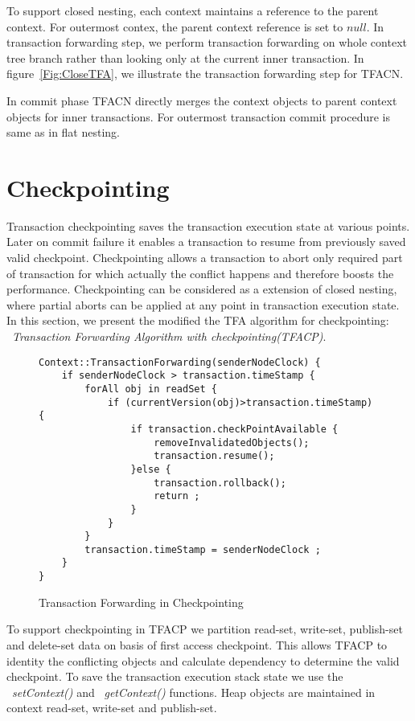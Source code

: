 \documentclass[12pt,english]{report}
\begin{document}
To support closed nesting, each context maintains a reference to the parent context. For outermost contex, the parent context reference is set to $null$. In transaction forwarding step, we perform transaction forwarding on whole context tree branch rather than looking only at the current inner transaction. In figure~\ref{Fig:CloseTFA}, we illustrate the transaction forwarding step for TFACN.

In commit phase TFACN directly merges the context objects to parent context objects for inner transactions. For outermost transaction commit procedure is same as in flat nesting. 

\section{Checkpointing}

Transaction checkpointing saves the transaction execution state at various points. Later on commit failure it enables a transaction to resume from previously saved valid checkpoint. Checkpointing allows a transaction to abort only required part of transaction for which actually the conflict happens and therefore boosts the performance. Checkpointing can be considered as a extension of closed nesting, where partial aborts can be applied at any point in transaction execution state. In this section, we present the modified the TFA algorithm for checkpointing: ~\emph{Transaction Forwarding Algorithm with checkpointing(TFACP)}.

\begin{figure}[H]
\begin{minipage}[b]{0.9\linewidth}\centering
\begin{lstlisting}
Context::TransactionForwarding(senderNodeClock) {
	if senderNodeClock > transaction.timeStamp {
		forAll obj in readSet {
			if (currentVersion(obj)>transaction.timeStamp) { 
				if transaction.checkPointAvailable {
					removeInvalidatedObjects();
					transaction.resume();
				}else {
					transaction.rollback();
					return ;
				}		
			}
		}
		transaction.timeStamp = senderNodeClock ; 
	}
}
\end{lstlisting}
\end{minipage}
\caption{Transaction Forwarding in Checkpointing}
\label{Fig:CheckPointTFA}
\end{figure} 

To support checkpointing in TFACP we partition read-set, write-set, publish-set and delete-set data on basis of first access checkpoint. This allows TFACP to identity the conflicting objects and calculate dependency to determine the valid checkpoint. To save the transaction execution stack state we use the ~\emph{setContext()} and ~\emph{getContext()} functions. Heap objects are maintained in context read-set, write-set and publish-set.  
\end{document}
